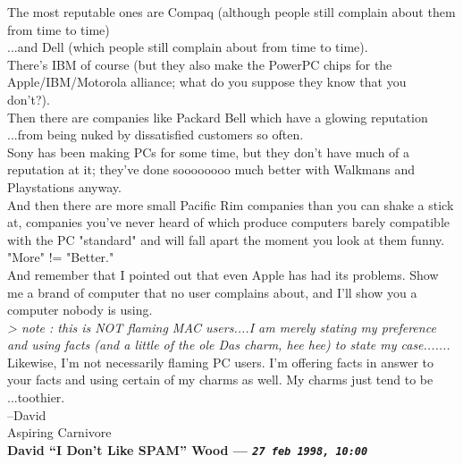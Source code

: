 \documentclass[11pt,twoside,a4paper]{article}
\begin{document}
\begin{multicols*}{2}
The most reputable ones are Compaq (although people still complain about them from time to time)~\\

...and Dell (which people still complain about from time to time).~\\

There's IBM of course (but they also make the PowerPC chips for the Apple/IBM/Motorola alliance; what do you suppose they know that you don't?).~\\

Then there are companies like Packard Bell which have a glowing reputation ...from being nuked by dissatisfied customers so often.~\\

Sony has been making PCs for some time, but they don't have much of a reputation at it; they've done soooooooo much better with Walkmans and Playstations anyway.~\\

And then there are more small Pacific Rim companies than you can shake a stick at, companies you've never heard of which produce computers barely compatible with the PC "standard" and will fall apart the moment you look at them funny.~\\

"More" != "Better."~\\

And remember that I pointed out that even Apple has had its problems. Show me a brand of computer that no user complains about, and I'll show you a computer nobody is using.~\\

\emph{> note :  this is NOT flaming MAC users....I am merely stating my preference and using facts (and a little of the ole Das charm, hee hee) to state my case.......}~\\

Likewise, I'm not necessarily flaming PC users. I'm offering facts in answer to your facts and using certain of my charms as well. My charms just tend to be ...toothier.~\\

--David~\\
Aspiring Carnivore~\\

 
		
	
		
\textbf{David ``I Don't Like SPAM'' Wood --- \emph{\texttt{27 feb 1998, 10:00}}}~\\


\end{multicols*}
\end{document}
